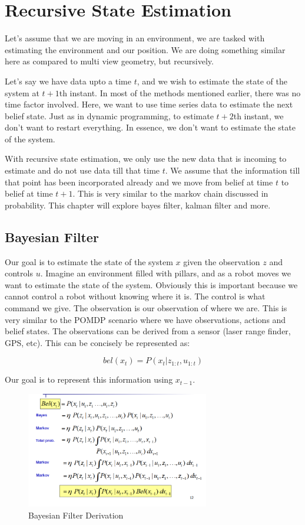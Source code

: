\chapter{Recursive State Estimation}

Let's assume that we are moving in an environment, we are tasked with estimating the environment and our position. We are doing something similar here as compared to multi view geometry, but recursively.

Let's say we have data upto a time $t$, and we wish to estimate the state of the system at $t+1$th instant. In most of the methods mentioned earlier, there was no time factor involved. Here, we want to use time series data to estimate the next belief state. Just as in dynamic programming, to estimate $t+2$th instant, we don't want to restart everything. In essence, we don't want to estimate the state of the system.

With recursive state estimation, we only use the new data that is incoming to estimate and do not use data till that time $t$. We assume that the information till that point has been incorporated already and we move from belief at time $t$ to belief at time $t+1$. This is very similar to the markov chain discussed in probability. This chapter will explore bayes filter, kalman filter and more. 

\section{Bayesian Filter}

Our goal is to estimate the state of the system $x$ given the observation $z$ and controls $u$. Imagine an environment filled with pillars, and as a robot moves we want to estimate the state of the system. Obviously this is important because we cannot control a robot without knowing where it is. The control is what command we give. The observation is our observation of where we are. This is very similar to the POMDP scenario where we have observations, actions and belief states. The observations can be derived from a sensor (laser range finder, GPS, etc). This can be concisely be represented as:

\begin{equation}
    bel(x_t) = P(x_t|z_{1:t},u_{1:t})
\end{equation}

Our goal is to represent this information using $x_{t-1}$.

\begin{figure}
    \centering
    \includegraphics[width=8cm]{img/bayes-filter.png}
    \caption{Bayesian Filter Derivation}
    \label{fig:bayes_filter}
\end{figure}

